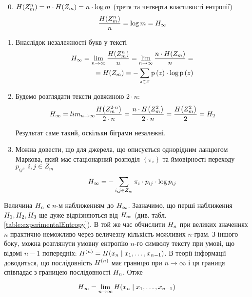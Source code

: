 \begin{enumerate}[label=\bfseries M\arabic*:]
    \setcounter{enumi}{-1}
    \item $H\!\left( Z_{m}^{n} \right)=n\cdot H\!\left( Z_{m} \right)=n\cdot \log{m}$
        (третя та четверта властивості ентропії)
        $$\frac{H\!\left( Z_{m}^{n} \right)}{n}=\log{m}=H_{\infty}$$
    \item Внаслідок незалежності букв у тексті
        \begin{align*}
            H_\infty
                = \lim_{n\to\infty}\frac{H\!\left( Z_{m}^{n} \right)}{n}
                = \lim_{n\to\infty}\frac{n \cdot H\!\left( Z_{m} \right)}{n} = \\
                = H\!\left( Z_{m} \right)
                = - \sum_{z \in Z} \mathrm{p}\left(z\right)\cdot \log{\mathrm{p}\left(z\right)}
        \end{align*}
    \item Будемо розглядати тексти довжиною $2 \cdot n$:
        $$H_\infty
            = lim_{n\to\infty}\frac{H\!\left( Z_{m}^{2 \cdot n} \right)}{2 \cdot n}
            =\frac{n \cdot H\!\left( Z_{m}^{2} \right)}{2 \cdot n}
            =\frac{H\!\left( Z_{m}^{2} \right)}{2}
            =H_2$$

        Результат саме такий, оскільки біграми незалежні.
    \item Можна довести, що для джерела, що описується однорідним ланцюгом
        Маркова, який має стаціонарний розподіл  $\left\{ \pi_{i} \right\}$
        та ймовірності переходу $p_{ij},\; i,j \in Z_{m}$
        $$H_\infty
            = - \sum_{i,j\in Z_m} \pi_{i} \cdot p_{ij} \cdot \log{p_{ij}}$$
\end{enumerate}

Величина  $H_n$ є  $n$-м наближенням до  $H_\infty$. Зазначимо,
що перші наближення  $H_1,H_2,H_3$ ще дуже відрізняються від 
$H_\infty$ (див. табл. \ref{table:experimentalEntropy}). В той же час обчислити
$H_n$ при великих значеннях  $n$ практично неможливо  через величезну кількість
можливих $n$-грам. З іншого боку, можна розглянути умовну ентропію 
$n$-го символу тексту при умові, що відомі  $n-1$ попередніх: 
$H^{\left( n \right)} = H\!\left( x_n \;\middle|\; x_1,\dots,x_{n-1} \right)$. В теорії
інформації доводиться, що послідовність  $H^{(n)}$ має границю при 
$n\rightarrow \infty$ і ця границя співпадає з границею послідовності $H_n$.
Отже

$$H_\infty
    = \lim_{n\rightarrow \infty} H\!\left( x_n \;\middle|\; x_1,\dots,x_{n-1} \right)$$


